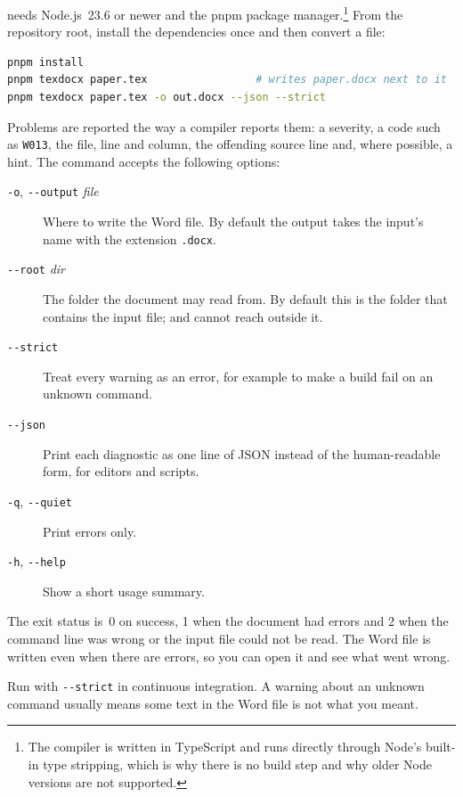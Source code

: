 \texdocx{} needs Node.js~23.6 or newer and the pnpm package
manager.\footnote{The compiler is written in TypeScript and runs directly
through Node's built-in type stripping, which is why there is no build step and
why older Node versions are not supported.} From the repository root, install
the dependencies once and then convert a file:
\begin{lstlisting}[language=bash]
pnpm install
pnpm texdocx paper.tex                 # writes paper.docx next to it
pnpm texdocx paper.tex -o out.docx --json --strict
\end{lstlisting}

Problems are reported the way a compiler reports them: a severity, a code such
as \texttt{W013}, the file, line and column, the offending source line and,
where possible, a hint. The command accepts the following options:
\begin{description}
  \item[\texttt{-o}, \texttt{-{}-output} \textit{file}] Where to write the
        Word file. By default the output takes the input's name with the
        extension \texttt{.docx}.
  \item[\texttt{-{}-root} \textit{dir}] The folder the document may read
        from. By default this is the folder that contains the input file;
         and  cannot reach outside it.
  \item[\texttt{-{}-strict}] Treat every warning as an error, for example to
        make a build fail on an unknown command.
  \item[\texttt{-{}-json}] Print each diagnostic as one line of JSON instead of
        the human-readable form, for editors and scripts.
  \item[\texttt{-q}, \texttt{-{}-quiet}] Print errors only.
  \item[\texttt{-h}, \texttt{-{}-help}] Show a short usage summary.
\end{description}
The exit status is~0 on success, 1 when the document had errors and 2 when the
command line was wrong or the input file could not be read. The Word file is written even when there are
errors, so you can open it and see what went wrong.

\begin{tip}
Run \texdocx{} with \texttt{-{}-strict} in continuous integration. A warning
about an unknown command usually means some text in the Word file is not what
you meant.
\end{tip}


